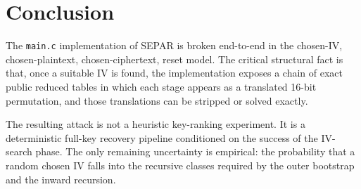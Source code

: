 \documentclass[11pt]{article}
\begin{document}
\section{Conclusion}
The \texttt{main.c} implementation of SEPAR is broken end-to-end in the chosen-IV, chosen-plaintext, chosen-ciphertext, reset model. The critical structural fact is that, once a suitable IV is found, the implementation exposes a chain of exact public reduced tables in which each stage appears as a translated 16-bit permutation, and those translations can be stripped or solved exactly.

The resulting attack is not a heuristic key-ranking experiment. It is a deterministic full-key recovery pipeline conditioned on the success of the IV-search phase. The only remaining uncertainty is empirical: the probability that a random chosen IV falls into the recursive classes required by the outer bootstrap and the inward recursion.
\end{document}

